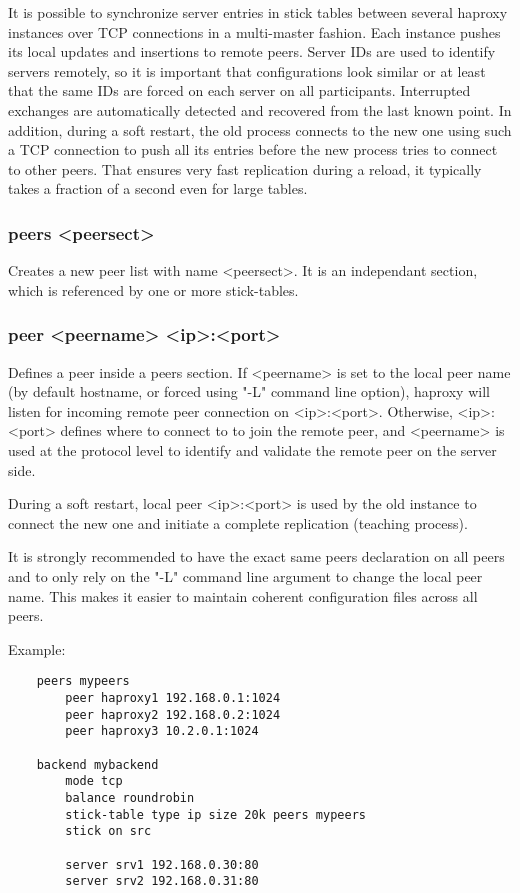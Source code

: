 It is possible to synchronize server entries in stick tables between several
haproxy instances over TCP connections in a multi-master fashion. Each instance
pushes its local updates and insertions to remote peers. Server IDs are used to
identify servers remotely, so it is important that configurations look similar
or at least that the same IDs are forced on each server on all participants.
Interrupted exchanges are automatically detected and recovered from the last
known point. In addition, during a soft restart, the old process connects to
the new one using such a TCP connection to push all its entries before the new
process tries to connect to other peers. That ensures very fast replication
during a reload, it typically takes a fraction of a second even for large
tables.

\subsubsection[peers]{peers <peersect>}
  Creates a new peer list with name <peersect>. It is an independant section,
  which is referenced by one or more stick-tables.

\subsubsection[peer]{peer <peername> <ip>:<port>}
  Defines a peer inside a peers section.
  If <peername> is set to the local peer name (by default hostname, or forced
  using "-L" command line option), haproxy will listen for incoming remote peer
  connection on <ip>:<port>. Otherwise, <ip>:<port> defines where to connect to
  to join the remote peer, and <peername> is used at the protocol level to
  identify and validate the remote peer on the server side.

  During a soft restart, local peer <ip>:<port> is used by the old instance to
  connect the new one and initiate a complete replication (teaching process).

  It is strongly recommended to have the exact same peers declaration on all
  peers and to only rely on the "-L" command line argument to change the local
  peer name. This makes it easier to maintain coherent configuration files
  across all peers.

  Example:
\begin{verbatim}
    peers mypeers
        peer haproxy1 192.168.0.1:1024
        peer haproxy2 192.168.0.2:1024
        peer haproxy3 10.2.0.1:1024

    backend mybackend
        mode tcp
        balance roundrobin
        stick-table type ip size 20k peers mypeers
        stick on src

        server srv1 192.168.0.30:80
        server srv2 192.168.0.31:80
\end{verbatim}
